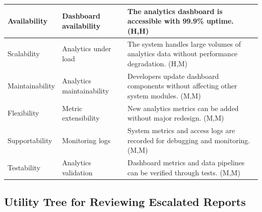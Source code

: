 \documentclass{article}
\begin{document}
\begin{table}[H]
\begin{tabular}{|p{3cm}|p{4cm}|p{7cm}|}
        Availability
                                   & Dashboard availability
                                   & The analytics dashboard is accessible with 99.9\% uptime. (H,H)                                                                     \\
        \hline

        Scalability
                                   & Analytics under load
                                   & The system handles large volumes of analytics data without performance degradation. (H,M)                                           \\
        \hline

        Maintainability
                                   & Analytics maintainability
                                   & Developers update dashboard components without affecting other system modules. (M,M)                                                \\
        \hline

        Flexibility
                                   & Metric extensibility
                                   & New analytics metrics can be added without major redesign. (M,M)                                                                    \\
        \hline

        Supportability
                                   & Monitoring logs
                                   & System metrics and access logs are recorded for debugging and monitoring. (M,M)                                                     \\
        \hline

        Testability
                                   & Analytics validation
                                   & Dashboard metrics and data pipelines can be verified through tests. (M,M)                                                           \\
        \hline
    \end{tabular}
\end{table}

\subsection{Utility Tree for Reviewing Escalated Reports}
\end{document}

